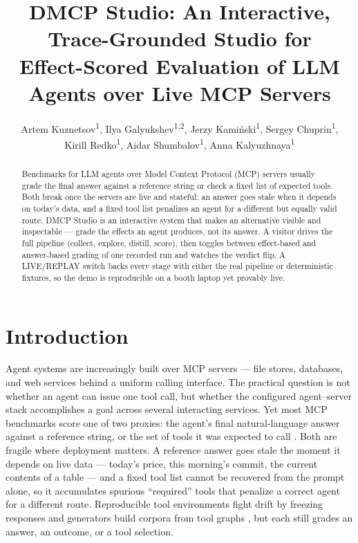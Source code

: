 \documentclass[letterpaper]{article} %
\title{DMCP Studio: An Interactive, Trace-Grounded Studio for\\
  Effect-Scored Evaluation of LLM Agents over Live MCP Servers}
\author{
    Artem Kuznetsov\equalcontrib\textsuperscript{\rm 1},
    Ilya Galyukshev\equalcontrib\textsuperscript{\rm 1,\rm 2},
    Jerzy Kami\'nski\corresponding\textsuperscript{\rm 1},
    Sergey Chuprin\textsuperscript{\rm 1},\\
    Kirill Redko\textsuperscript{\rm 1},
    Aidar Shumbalov\textsuperscript{\rm 1},
    Anna Kalyuzhnaya\textsuperscript{\rm 1}
}
\begin{document}
\maketitle

\begin{abstract}
Benchmarks for LLM agents over Model Context Protocol (MCP) servers usually
grade the final answer against a reference string or check a fixed list of
expected tools. Both break once the servers are live and stateful: an answer
goes stale when it depends on today's data, and a fixed tool list penalizes an
agent for a different but equally valid route. DMCP Studio
is an interactive system that makes an alternative visible and inspectable ---
grade the effects an agent produces, not its answer. A visitor drives the full
pipeline (collect, explore, distill, score), then toggles between effect-based
and answer-based grading of one recorded run and watches the verdict flip. A
LIVE/REPLAY switch backs every stage with either the real pipeline or
deterministic fixtures, so the demo is reproducible on a booth laptop yet
provably live.
\end{abstract}

\begin{links}
\end{links}

\section{Introduction}

Agent systems are increasingly built over MCP servers --- file stores,
databases, and web services behind a uniform calling interface. The practical
question is not whether an agent can issue one tool call, but whether the
configured agent--server stack accomplishes a goal across several interacting
services. Yet most MCP benchmarks score one of two proxies: the agent's final
natural-language answer against a reference string, or the set of tools it was
expected to call \citep{fan2025mcptoolbench++, mo2025livemcpbench, wang2025mcp,
bandi2026mcp}. Both are fragile where deployment matters. A reference answer
goes stale the moment it depends on live data --- today's price, this morning's
commit, the current contents of a table --- and a fixed tool list cannot be
recovered from the prompt alone, so it accumulates spurious ``required'' tools
that penalize a correct agent for a different route. Reproducible tool
environments fight drift by freezing responses \citep{guo2024stabletoolbench,
lu2025toolsandbox, yao2024tau} and generators build corpora from tool
graphs \citep{liu2025mcpeval, shen2024taskbench}, but each still grades an
answer, an outcome, or a tool selection.
\end{document}
